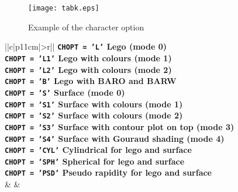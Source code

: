 \vfill
\clearpage

\begin{figure}[p]
\begin{center} \texttt{[image: tabk.eps]}\end{center}
\caption{Example of the \protect{} character \protect{} option}
\label{TABK}
\end{figure}

\vfill
\clearpage

\begin{table}[p]
\begin{center}
\begin{tabular}{||c|p{11cm}|>{\tt}r||}
\hline
{}
{\bf {\tt CHOPT = 'L'} Lego (mode 0)}                                         \\
{\bf {\tt CHOPT = 'L1'} Lego with colours (mode 1)}                           \\
{\bf {\tt CHOPT = 'L2'} Lego with colours (mode 2)}                           \\
{\bf {\tt CHOPT = 'B'} Lego with BARO and BARW}                               \\
\hline
{}
{\bf {\tt CHOPT = 'S'} Surface (mode 0)}                                      \\
{\bf {\tt CHOPT = 'S1'} Surface with colours (mode 1)}                        \\
{\bf {\tt CHOPT = 'S2'} Surface with colours (mode 2)}                        \\
{\bf {\tt CHOPT = 'S3'} Surface with contour plot on top (mode 3)}            \\
{\bf {\tt CHOPT = 'S4'} Surface with Gouraud shading (mode 4)}                \\
\hline
{}
{\bf {\tt CHOPT = 'CYL'} Cylindrical for lego and surface}                    \\
{\bf {\tt CHOPT = 'SPH'} Spherical for lego and surface}                      \\
{\bf {\tt CHOPT = 'PSD'} Pseudo rapidity for lego and surface}                \\
\hline
{}       &
        &
                          \\

\end{tabular}
\end{center}
\end{table}
